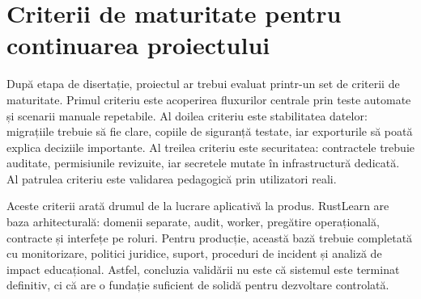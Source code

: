 \section{Criterii de maturitate pentru continuarea proiectului}
După etapa de disertație, proiectul ar trebui evaluat printr-un set de criterii de maturitate. Primul criteriu este acoperirea fluxurilor centrale prin teste automate și scenarii manuale repetabile. Al doilea criteriu este stabilitatea datelor: migrațiile trebuie să fie clare, copiile de siguranță testate, iar exporturile să poată explica deciziile importante. Al treilea criteriu este securitatea: contractele trebuie auditate, permisiunile revizuite, iar secretele mutate în infrastructură dedicată. Al patrulea criteriu este validarea pedagogică prin utilizatori reali.

Aceste criterii arată drumul de la lucrare aplicativă la produs. RustLearn are baza arhitecturală: domenii separate, audit, worker, pregătire operațională, contracte și interfețe pe roluri. Pentru producție, această bază trebuie completată cu monitorizare, politici juridice, suport, proceduri de incident și analiză de impact educațional. Astfel, concluzia validării nu este că sistemul este terminat definitiv, ci că are o fundație suficient de solidă pentru dezvoltare controlată.
